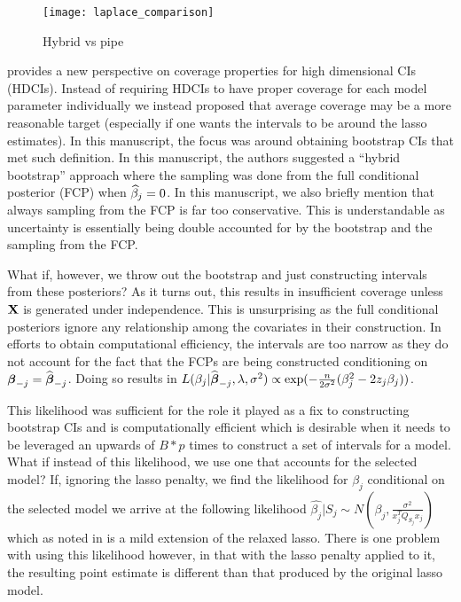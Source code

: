 \begin{figure}[hbtp]
    \begin{center}
    \texttt{[image: laplace\_comparison]}
    \caption{\label{Fig:laplace_comparison} Hybrid vs pipe}
    \end{center}
\end{figure}
    

 provides a new perspective on coverage properties for high dimensional CIs (HDCIs). Instead of requiring HDCIs to have proper coverage for each model parameter individually we instead proposed that average coverage may be a more reasonable target (especially if one wants the intervals to be around the lasso estimates). In this manuscript, the focus was around obtaining bootstrap CIs that met such definition. In this manuscript, the authors suggested a ``hybrid bootstrap'' approach where the sampling was done from the full conditional posterior (FCP) when $\widehat{\beta}_j = 0$. In this manuscript, we also briefly mention that always sampling from the FCP is far too conservative. This is understandable as uncertainty is essentially being double accounted for by the bootstrap and the sampling from the FCP. 

What if, however, we throw out the bootstrap and just constructing intervals from these posteriors? As it turns out, this results in insufficient coverage unless $\mathbf{X}$ is generated under independence. This is unsurprising as the full conditional posteriors ignore any relationship among the covariates in their construction. In efforts to obtain computational efficiency, the intervals are too narrow as they do not account for the fact that the FCPs are being constructed conditioning on $\boldsymbol{\beta}_{-j} = \widehat{\boldsymbol{\beta}}_{-j}$. Doing so results in $L(\beta_j|\widehat{\boldsymbol{\beta}}_{-j}, \lambda, \sigma^2) \propto \exp(-\frac{n}{2\sigma^2}(\beta_{j}^2 - 2 z_{j} \beta_{j}))$.

This likelihood was sufficient for the role it played as a fix to constructing bootstrap CIs and is computationally efficient which is desirable when it needs to be leveraged an upwards of $B*p$ times to construct a set of intervals for a model. What if instead of this likelihood, we use one that accounts for the selected model? If, ignoring the lasso penalty, we find the likelihood for $\beta_j$ conditional on the selected model we arrive at the following likelihood $\hat{\beta_j} | S_j \sim N(\beta_j, \frac{\sigma^2}{x_j^T Q_{S_j} x_j})$ which as noted in  is a mild extension of the relaxed lasso. There is one problem with using this likelihood however, in that with the lasso penalty applied to it, the resulting point estimate is different than that produced by the original lasso model. 

